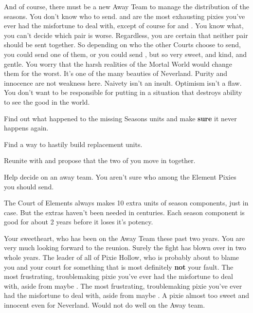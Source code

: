 \documentclass[char]{PP}
\begin{document}
And of course, there must be a new Away Team to manage the distribution of the seasons.  You don't know who to send. \cETitan{} and \cFTitan{} are the most exhausting pixies you've ever had the misfortune to deal with, except of course for \cEAirship{} and \cMAirship{}. You know what, you can't decide which pair is worse. Regardless, you are certain that neither pair should be sent together. So depending on who the other Courts choose to send, you could send one of them, or you could send \cESweet{}, but \cESweet{\they} \cESweet{\are} so very sweet, and kind, and gentle. You worry that the harsh realities of the Mortal World would change them for the worst. It's one of the many beauties of Neverland. Purity and innocence are not weakness here. Naivety isn't an insult. Optimism isn't a flaw. You don't want to be responsible for putting \cESweet{} in a situation that destroys \cESweet{\their} ability to see the good in the world.


\begin{itemz}
	\item Find out what happened to the missing Seasons units and make \textbf{sure} it never happens again.
	\item Find a way to hastily build replacement units.
	\item Reunite with \cELove{} and propose that the two of you move in together.
	\item Help \cSHead{} decide on an away team. You aren't sure who among the Element Pixies you should send.
\end{itemz}

\begin{itemz}[Notes]
	\item The Court of Elements always makes 10 extra units of season components, just in case. But the extras haven't been needed in centuries. Each season component is good for about 2 years before it loses it's potency.
\end{itemz}

\begin{contacts}
	\contact{\cELove{}} Your sweetheart, who has been on the Away Team these past two years. You are very much looking forward to the reunion. Surely the fight has blown over in two whole years.
	\contact{\cSHead{}} The leader of all of Pixie Hollow, who is probably about to blame you and your court for something that is most definitely \textbf{not} your fault.
	\contact{\cEAirship{}} The most frustrating, troublemaking pixie you've ever had the misfortune to deal with, aside from maybe \cETitan{}.
	\contact{\cETitan{}} The most frustrating, troublemaking pixie you've ever had the misfortune to deal with, aside from maybe \cEAirship{}.
	\contact{\cESweet{}} A pixie almost too sweet and innocent even for Neverland. Would not do well on the Away team.
\end{contacts}
\end{document}
